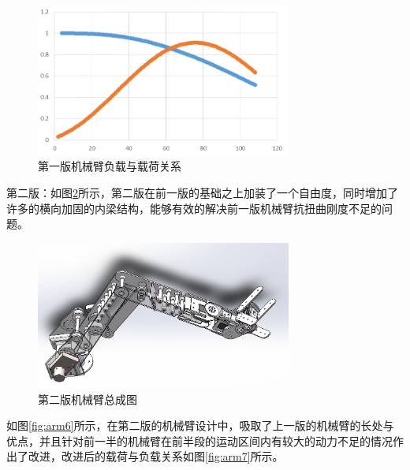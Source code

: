 \begin{figure}[H]
    \centering
    \includegraphics[width = 0.75\textwidth]{images/arm_4.png}
    \caption{第一版机械臂负载与载荷关系}
    \label{fig:arm4}
\end{figure}

第二版：如图\ref{fig:arm5}所示，第二版在前一版的基础之上加装了一个自由度，同时增加了许多的横向加固的内梁结构，能够有效的解决前一版机械臂抗扭曲刚度不足的问题。

\begin{figure}[H]
    \centering
    \includegraphics[width = 0.75\textwidth]{images/arm_5.png}
    \caption{第二版机械臂总成图}
    \label{fig:arm5}
\end{figure}

如图\ref{fig:arm6}所示，在第二版的机械臂设计中，吸取了上一版的机械臂的长处与优点，并且针对前一半的机械臂在前半段的运动区间内有较大的动力不足的情况作出了改进，改进后的载荷与负载关系如图\ref{fig:arm7}所示。


